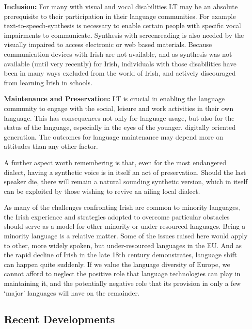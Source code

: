 \begin{multicols}{2}
\textbf{Inclusion:} For many with visual and vocal disabilities LT may be an absolute prerequisite to their participation in their language communities.  For example text-to-speech-synthesis is necessary to enable certain people with specific vocal impairments to communicate.  Synthesis with screenreading is also needed by the visually impaired to access electronic or web based materials.  Because communication devices with Irish are not available, and as synthesis was not available (until very recently) for Irish, individuals with those disabilities have been in many ways excluded from the world of Irish, and actively discouraged from learning Irish in schools.

\textbf{Maintenance and Preservation:} LT is crucial in enabling the language community to engage with the social, leisure and work activities in their own language. This has consequences not only for language usage, but also for the status of the language, especially in the eyes of the younger, digitally oriented generation. The outcomes for language maintenance may depend more on attitudes than any other factor.

A further aspect worth remembering is that, even for the most endangered dialect, having a synthetic voice is in itself an act of preservation. Should the last speaker die, there will remain a natural sounding synthetic version, which in itself can be exploited by those wishing to revive an ailing local dialect.

As many of the challenges confronting Irish are common to minority languages, the Irish experience and strategies adopted to overcome particular obstacles should serve as a model for other minority or under-resourced languages. Being a minority language is a relative matter. Some of the issues raised here would apply to other, more widely spoken, but under-resourced languages in the EU. And as the rapid decline of Irish in the late 18th century demonstrates, language shift can happen quite suddenly. If we value the language diversity of Europe, we cannot afford to neglect the positive role that language technologies can play in maintaining it, and the potentially negative role that its provision in only a few `major' languages will have on the remainder.



\subsection{Recent Developments}


\end{multicols}
